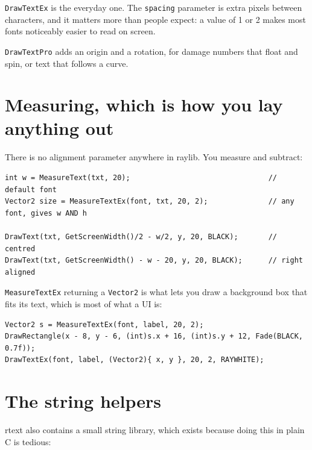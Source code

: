 \lstinline|DrawTextEx| is the everyday one. The \lstinline|spacing| parameter is
extra pixels between characters, and it matters more than people expect: a value
of 1 or 2 makes most fonts noticeably easier to read on screen.

\lstinline|DrawTextPro| adds an origin and a rotation, for damage numbers that
float and spin, or text that follows a curve.

\section{Measuring, which is how you lay anything out}

There is no alignment parameter anywhere in raylib. You measure and subtract:

\begin{lstlisting}
int w = MeasureText(txt, 20);                                // default font
Vector2 size = MeasureTextEx(font, txt, 20, 2);              // any font, gives w AND h

DrawText(txt, GetScreenWidth()/2 - w/2, y, 20, BLACK);       // centred
DrawText(txt, GetScreenWidth() - w - 20, y, 20, BLACK);      // right aligned
\end{lstlisting}

\lstinline|MeasureTextEx| returning a \lstinline|Vector2| is what lets you draw a
background box that fits its text, which is most of what a UI is:

\begin{lstlisting}
Vector2 s = MeasureTextEx(font, label, 20, 2);
DrawRectangle(x - 8, y - 6, (int)s.x + 16, (int)s.y + 12, Fade(BLACK, 0.7f));
DrawTextEx(font, label, (Vector2){ x, y }, 20, 2, RAYWHITE);
\end{lstlisting}

\section{The string helpers}

rtext also contains a small string library, which exists because doing this in
plain C is tedious:

